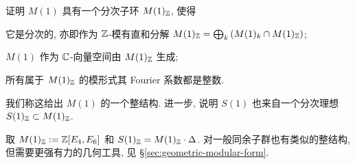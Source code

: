 \begin{exercise}\label{exo:M(1)-integral}
	证明 $M(1)$ 具有一个分次子环 $M(1)_{\mathbb{Z}}$, 使得
	\begin{compactitem}
		\item 它是分次的, 亦即作为 $\mathbb{Z}$-模有直和分解 $M(1)_{\mathbb{Z}} = \bigoplus_k \left( M(1)_k \cap M(1)_{\mathbb{Z}} \right)$;
		\item $M(1)$ 作为 $\mathbb{C}$-向量空间由 $M(1)_{\mathbb{Z}}$ 生成;
		\item 所有属于 $M(1)_{\mathbb{Z}}$ 的模形式其 Fourier 系数都是整数.
	\end{compactitem}
	我们称这给出 $M(1)$ 的一个整结构. 进一步, 说明 $S(1)$ 也来自一个分次理想 $S(1)_{\mathbb{Z}} \subset M(1)_{\mathbb{Z}}$.
	
	\begin{hint}
		取 $M(1)_{\mathbb{Z}} := \mathbb{Z}[E_4, E_6]$ 和 $S(1)_{\mathbb{Z}} = M(1)_{\mathbb{Z}} \cdot \Delta$. 对一般同余子群也有类似的整结构, 但需要更强有力的几何工具, 见 \S\ref{sec:geometric-modular-form}.
	\end{hint}
\end{exercise}

